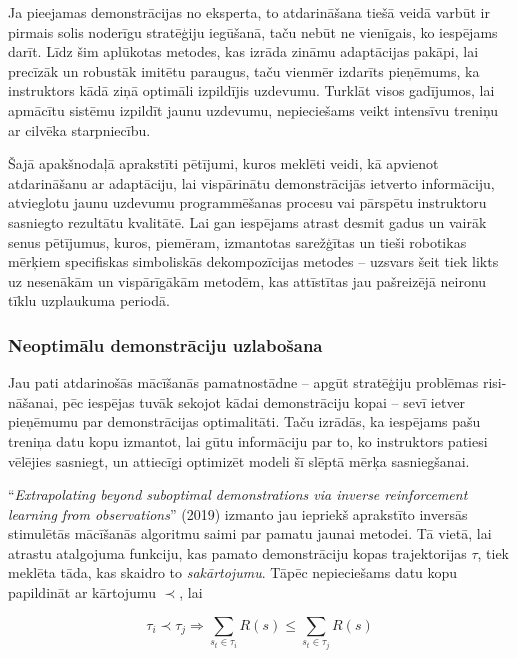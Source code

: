 \documentclass[12pt, a4paper]{article}
\numberwithin{equation}{section} %
\begin{document}
Ja pieejamas demonstrācijas no eksperta, to atdarināšana tiešā veidā varbūt ir pirmais solis noderīgu stratēģiju iegūšanā, taču nebūt ne vienīgais, ko iespējams darīt. Līdz šim aplūkotas metodes, kas izrāda zināmu adaptācijas pakāpi, lai precīzāk un robustāk imitētu paraugus, taču vienmēr izdarīts pieņēmums, ka instruktors kādā ziņā optimāli izpildījis uzdevumu. Turklāt visos gadījumos, lai apmācītu sistēmu izpildīt jaunu uzdevumu, nepieciešams veikt intensīvu treniņu ar cilvēka starpniecību. 

Šajā apakšnodaļā aprakstīti pētījumi, kuros meklēti veidi, kā apvienot atdarināšanu ar adaptāciju, lai vispārinātu demonstrācijās ietverto informāciju, atvieglotu jaunu uzdevumu programmēšanas procesu vai pārspētu instruktoru sasniegto rezultātu kvalitātē. Lai gan iespējams atrast desmit gadus un vairāk senus pētījumus, kuros, piemēram, izmantotas sarežģītas un tieši robotikas mērķiem specifiskas simboliskās dekompozīcijas metodes \cite{pastor2011skill} -- uzsvars šeit tiek likts uz nesenākām un vispārīgākām metodēm, kas attīstītas jau pašreizējā neironu tīklu uzplaukuma periodā.

\subsubsection{Neoptimālu demonstrāciju uzlabošana}

Jau pati atdarinošās mācīšanās pamatnostādne -- apgūt stratēģiju problēmas risi-nāšanai, pēc iespējas tuvāk sekojot kādai demonstrāciju kopai -- sevī ietver pieņēmumu par demonstrācijas optimalitāti. Taču izrādās, ka iespējams pašu treniņa datu kopu izmantot, lai gūtu informāciju par to, ko instruktors patiesi vēlējies sasniegt, un attiecīgi optimizēt modeli šī slēptā mērķa sasniegšanai.

``\textit{Extrapolating beyond suboptimal demonstrations via inverse reinforcement learning from observations}'' \cite{brown2019extrapolating} (2019) izmanto jau iepriekš aprakstīto inversās stimulētās mācīšanās algoritmu saimi par pamatu jaunai metodei. Tā vietā, lai atrastu atalgojuma funkciju, kas pamato demonstrāciju kopas trajektorijas $\tau$, tiek meklēta tāda, kas skaidro to \textit{sakārtojumu}. Tāpēc nepieciešams datu kopu papildināt ar kārtojumu $\prec$, lai

\begin{equation}
    \tau_i \prec \tau_j \Rightarrow \sum_{s_t \in \tau_i}R(s) \leq \sum_{s_t \in \tau_j}R(s)
\end{equation}
\end{document}
